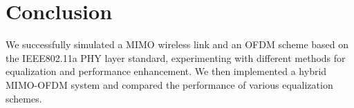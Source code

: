 \documentclass[conference]{IEEEtran}
\begin{document}
\section{Conclusion} 
We successfully simulated a MIMO wireless link and an OFDM scheme based on the IEEE802.11a PHY layer standard, experimenting with different methods for equalization and performance enhancement. We then implemented a hybrid MIMO-OFDM system and compared the performance of various equalization schemes.  



\end{document}

